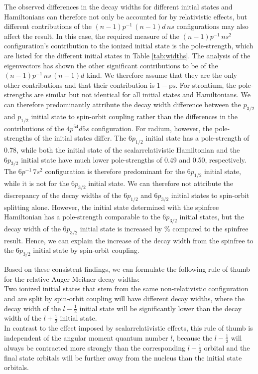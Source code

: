 The observed differences in the decay widths for different initial states and
Hamiltonians can therefore not only be accounted for by relativistic
effects, but different contributions of the $(n-1)p^{-1} \,(n-1)d \, ns$
configurations may also affect the result.
In this case, the required measure of the $(n-1)p^{-1} \, ns^2$ configuration's
contribution to the ionized initial state is the pole-strength,
which are listed for the different initial states in Table \ref{tab:widths}.
The analysis of the eigenvectors has shown the other significant contributions
to be of the $(n-1)p^{-1} \,ns \, (n-1)d$ kind. We therefore assume that
they are the only other contributions and that their contribution is $1-\text{ps}$.
For strontium, the pole-strengths are similar but not identical for all initial
states and Hamiltonians. 
We can therefore predominantly attribute the decay width difference between the
$p_{3/2}$ and $p_{1/2}$ initial state to spin-orbit coupling rather than the
differences in the contributions of the $4p^54d5s$ configuration.
For radium, however, the pole-strengths of the initial states differ.
The $6p_{1/2}$ initial state has a pole-strength of 0.78, while both the
initial state of the scalarrelativistic Hamiltonian and the $6p_{3/2}$ initial
state have much lower pole-strengths of 0.49 and 0.50, respectively.
The $6p^{-1} \,7s^2$ configuration is therefore predominant for the $6p_{1/2}$
initial state, while it is not for the $6p_{3/2}$ initial state.
We can therefore not attribute the discrepancy of the decay widths of the
$6p_{1/2}$ and $6p_{3/2}$ initial states to spin-orbit splitting alone.
However, the initial state determined with the spinfree
Hamiltonian has a pole-strength comparable to the $6p_{3/2}$ initial states,
but the decay width of the $6p_{3/2}$ initial state is increased by \unit[236]{\%}
compared to the spinfree result.
Hence, we can explain the increase of the decay width from the spinfree to the
$6p_{3/2}$ initial state by spin-orbit coupling.


Based on these consistent findings, we can formulate the following rule of thumb for
the relative Auger-Meitner decay widths:\\
Two ionized initial states that stem from the same non-relativistic configuration and
are split by spin-orbit coupling will have different decay widths, where the decay width
of the $l-\frac12$ initial state will be significantly lower than the decay width of
the $l + \frac12$ initial state.\\
In contrast to the effect imposed by scalarrelativistic effects, this rule
of thumb is independent of the angular moment quantum number $l$, because the
$l-\frac12$ will always be contracted more strongly than the corresponding
$l+\frac12$ orbital and the final state orbitals will be further away from
the nucleus than the initial state orbitals.


